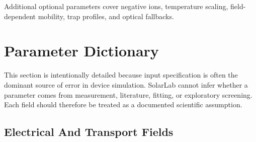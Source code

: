 \documentclass[
  11pt,
  american,
]{report}
\begin{document}
Additional optional parameters cover negative ions, temperature scaling,
field-dependent mobility, trap profiles, and optical fallbacks.

\hypertarget{parameter-dictionary}{%
\section{Parameter Dictionary}\label{parameter-dictionary}}

This section is intentionally detailed because input specification is
often the dominant source of error in device simulation. SolarLab cannot
infer whether a parameter comes from measurement, literature, fitting,
or exploratory screening. Each field should therefore be treated as a
documented scientific assumption.

\hypertarget{electrical-and-transport-fields}{%
\subsection{Electrical And Transport
Fields}\label{electrical-and-transport-fields}}
\end{document}
